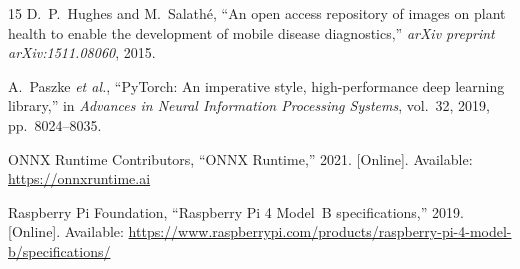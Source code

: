 \documentclass[conference]{IEEEtran}
\begin{document}
\begin{thebibliography}{15}
D.~P.~Hughes and M.~Salath\'{e}, ``An open access repository of images on
plant health to enable the development of mobile disease diagnostics,''
\emph{arXiv preprint arXiv:1511.08060}, 2015.

A.~Paszke \emph{et al.}, ``PyTorch: An imperative style,
high-performance deep learning library,'' in \emph{Advances in Neural
Information Processing Systems}, vol.~32, 2019, pp.~8024--8035.

ONNX Runtime Contributors, ``ONNX Runtime,'' 2021. [Online]. Available:
\url{https://onnxruntime.ai}

Raspberry Pi Foundation, ``Raspberry Pi 4 Model~B specifications,''
2019. [Online]. Available: \url{https://www.raspberrypi.com/products/raspberry-pi-4-model-b/specifications/}

\end{thebibliography}
\end{document}
